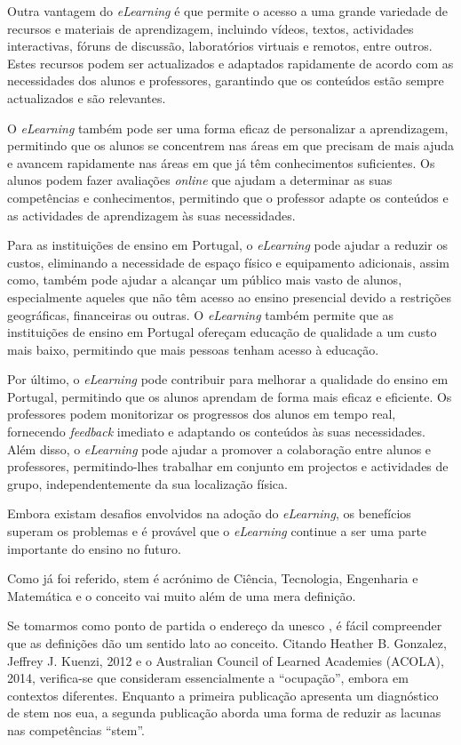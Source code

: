 Outra vantagem do \textit{eLearning} é que permite o acesso a uma grande variedade de recursos e materiais de aprendizagem, incluindo vídeos, textos, actividades interactivas, fóruns de discussão, laboratórios virtuais e remotos, entre outros. Estes recursos podem ser actualizados e adaptados rapidamente de acordo com as necessidades dos alunos e professores, garantindo que os conteúdos estão sempre actualizados e são relevantes.

O \textit{eLearning} também pode ser uma forma eficaz de personalizar a aprendizagem, permitindo que os alunos se concentrem nas áreas em que precisam de mais ajuda e avancem rapidamente nas áreas em que já têm conhecimentos suficientes. Os alunos podem fazer avaliações \textit{online} que ajudam a determinar as suas competências e conhecimentos, permitindo que o professor adapte os conteúdos e as actividades de aprendizagem às suas necessidades.

Para as instituições de ensino em Portugal, o \textit{eLearning} pode ajudar a reduzir os custos, eliminando a necessidade de espaço físico e equipamento adicionais, assim como, também pode ajudar a alcançar um público mais vasto de alunos, especialmente aqueles que não têm acesso ao ensino presencial devido a restrições geográficas, financeiras ou outras. O \textit{eLearning} também permite que as instituições de ensino em Portugal ofereçam educação de qualidade a um custo mais baixo, permitindo que mais pessoas tenham acesso à educação.

Por último, o \textit{eLearning} pode contribuir para melhorar a qualidade do ensino em Portugal, permitindo que os alunos aprendam de forma mais eficaz e eficiente. Os professores podem monitorizar os progressos dos alunos em tempo real, fornecendo \textit{feedback} imediato e adaptando os conteúdos às suas necessidades. Além disso, o \textit{eLearning} pode ajudar a promover a colaboração entre alunos e professores, permitindo-lhes trabalhar em conjunto em projectos e actividades de grupo, independentemente da sua localização física.

Embora existam desafios envolvidos na adoção do \textit{eLearning}, os benefícios superam os problemas e é provável que o \textit{eLearning} continue a ser uma parte importante do ensino no futuro.

Como já foi referido, \acrshort{stem} é acrónimo de Ciência, Tecnologia, Engenharia e Matemática e o conceito vai muito além de uma mera definição.

Se tomarmos como ponto de partida o endereço da \acrshort{unesco} \cite{GlossaryUNESCO}, é fácil compreender que as definições dão um sentido lato ao conceito. Citando Heather B. Gonzalez, Jeffrey J. Kuenzi, 2012 e o Australian Council of Learned Academies (ACOLA), 2014, verifica-se que consideram essencialmente a ``ocupação'', embora em contextos diferentes. Enquanto a primeira publicação apresenta um diagnóstico de \acrshort{stem} nos \acrfull{eua}, a segunda publicação aborda uma forma de reduzir as lacunas nas competências ``\acrshort{stem}''.

